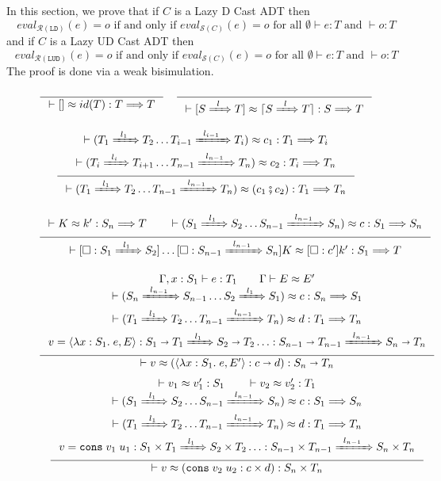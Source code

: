 \documentclass[runningheads]{llncs}
\newcommand{\infr}[2]{\inference{#1}{#2}}
\newcommand{\RMachine}[1]{\ensuremath{\mathcal{R}(#1)}}
\newcommand{\LDMachine}{\RMachine{\BLD}}
\newcommand{\LUDMachine}{\RMachine{\BLUD}}
\newcommand{\SMachine}[1]{\ensuremath{\mathcal{S}(#1)}}
\newcommand{\Pfunc}[2]{\ensuremath{#1 \shortrightarrow #2}}
\newcommand{\Pprod}[2]{\ensuremath{#1 \times #2}}
\newcommand{\elam}[3]{\lambda#1:#2.\;#3}
\newcommand{\econs}[2]{\mathtt{cons} \; #1 \; #2}
\newcommand{\ecast}[2]{\ensuremath{#1 : #2}}
\newcommand{\ccast}[3]{#1 \xRightarrow[]{\enskip #2 \enskip} #3}
\newcommand{\vfunc}[4]{\langle\elam{#1}{#2}{#3},#4\rangle}
\newcommand{\vfuncc}[6]{\ecast{#1}{\ccast{\Pfunc{#2}{#3}}{#4}{\Pfunc{#5}{#6}}}}
\newcommand{\vcons}[2]{\econs{#1}{#2}}
\newcommand{\vconsc}[6]{\ecast{#1}{\ccast{\Pprod{#2}{#3}}{#4}{\Pprod{#5}{#6}}}}
\newcommand{\BLD}[0]{\ensuremath{\mathtt{LD}}}
\newcommand{\BLUD}[0]{\ensuremath{\mathtt{LUD}}}
\newcommand{\Kcons}[2]{[#1]#2}
\newcommand{\Fcast}[1]{\ecast{\square}{#1}}
\newcommand{\compose}[2]{\ensuremath{#1 \fatsemi #2}}
\newcommand{\translate}[1]{\ensuremath{\lceil#1\rceil}}
\newcommand{\expressiontyping}[3]{\ensuremath{#1 \vdash #2 : #3}}
\newcommand{\valuetyping}[2]{\ensuremath{\vdash #1 : #2}}
\newcommand{\casttyping}[3]{\ensuremath{\vdash #1 : #2 \Longrightarrow #3}}
\newcommand{\withmachineevalto}[3]{\ensuremath{\mathit{eval}_{#1}(#2)=#3}}
\newcommand{\machineequiv}[2]{
	\ensuremath{
		\withmachineevalto{#1}{e}{o}	
		\text{ if and only if }
		\withmachineevalto{#2}{e}{o}
		\text{ for all }
		\expressiontyping{\emptyset}{e}{T}
		\text{ and }
		\valuetyping{o}{T}
	}}
\newcommand{\bisimE}[3]{\ensuremath{#1 \vdash #2 \approx #3}}
\newcommand{\bisimv}[3]{\valuetyping{#1 \approx #2}{#3}}
\newcommand{\bisimc}[4]{\casttyping{#1 \approx #2}{#3}{#4}}
\newcommand{\bisimK}[4]{\casttyping{#1 \approx #2}{#3}{#4}}
\begin{document}
In this section, we prove that if $C$ is a Lazy D Cast ADT then
\[
\machineequiv{\LDMachine}{\SMachine{C}}
\]
and if $C$ is a Lazy UD Cast ADT then
\[
\machineequiv{\LUDMachine}{\SMachine{C}}
\]
The proof is done via a weak bisimulation.


\begin{figure}

\fbox{\bisimc{\overline{\ccast{S}{l}{T}}}{c}{S}{T}}
\begin{gather*}
\infr{}{\bisimc{[]}{id(T)}{T}{T}} \quad
\infr{}{\bisimc{[\ccast{S}{l}{T}]}{\translate{\ccast{S}{l}{T}}}{S}{T}}
\\[1ex]
\infr{
	\bisimc{
		(\ccast{T_1}{l_1}{T_2}\ldots\ccast{T_{i-1}}{l_{i-1}}{T_i})
	}{c_1}{T_1}{T_i}\\
	\bisimc{
		(\ccast{T_i}{l_i}{T_{i+1}}\ldots\ccast{T_{n-1}}{l_{n-1}}{T_n})
	}{c_2}{T_i}{T_n}
}{
	\bisimc{
		(\ccast{T_1}{l_1}{T_{2}}\ldots\ccast{T_{n-1}}{l_{n-1}}{T_n})
	}{
		(\compose{c_1}{c_2})
	}{T_1}{T_n}
}
\end{gather*}

\fbox{$\bisimK{K}{K}{S}{T}$}
\begin{gather*}
\infr{
	\bisimK{K}{k'}{S_n}{T} \qquad
	\bisimc{
		(\ccast{S_1}{l_1}{S_2} \ldots \ccast{S_{n-1}}{l_{n-1}}{S_n})
	}{c}{S_1}{S_n}
}{
	\bisimK{
		\Kcons{
			\Fcast{\ccast{S_1}{l_1}{S_2}}
		}{\ldots\Kcons{\Fcast{\ccast{S_{n-1}}{l_{n-1}}{S_n}}}{K}}
	}{
		\Kcons{\Fcast{c'}}{k'}
	}{S_1}{T}
}
\end{gather*}

\fbox{$\bisimv{v}{v}{T}$}
\begin{gather*}
\infr{
	\expressiontyping{\Gamma,x : S_1}{e}{T_1}
	\qquad
	\bisimE{\Gamma}{E}{E'}
	\\
	\bisimc{
		(\ccast{S_n}{l_{n-1}}{S_{n-1}} \ldots
		\ccast{S_2}{l_1}{S_1})
	}{c}{S_n}{S_1}
	\\
	\bisimc{
		(		\ccast{T_1}{l_{1}}{T_2} \ldots
		\ccast{T_{n-1}}{l_{n-1}}{T_n}
		)	}{d}{T_1}{T_n}
	\\
	v = \vfuncc{
		\vfuncc{
			\vfunc{x}{S_1}{e}{E}
		}{S_1}{T_1}{l_1}{S_2}{T_2}
		\ldots
	}{S_{n-1}}{T_{n-1}}{l_{n-1}}{S_n}{T_n}
}{
	\bisimv{v}{
		(\ecast{\vfunc{x}{S_1}{e}{E'}}{\Pfunc{c}{d}})
	}{
		\Pfunc{S_n}{T_n}}
}
\\[1ex]
\infr{
	\bisimv{v_1}{v_1'}{S_1} \qquad
	\bisimv{v_2}{v_2'}{T_1} \\
	\bisimc{
		(\ccast{S_1}{l_{1}}{S_2} \ldots
		\ccast{S_{n-1}}{l_{n-1}}{S_n})
	}{c}{S_1}{S_n} \\
	\bisimc{
		(\ccast{T_1}{l_{1}}{T_2} \ldots
		\ccast{T_{n-1}}{l_{n-1}}{T_n})
	}{d}{T_1}{T_n}
	\\ v = \vconsc{
		\vconsc{
			\vcons{v_1}{u_1}
		}{S_1}{T_1}{l_1}{S_2}{T_2}
		\ldots
	}{S_{n-1}}{T_{n-1}}{l_{n-1}}{S_n}{T_n}
}{
	\bisimv{
		v
	}{
		(\ecast{\vcons{v_2}{u_2}}{\Pprod{c}{d}})
	}{
		\Pprod{S_n}{T_n}}
}
\end{gather*}
	

\end{figure}
\end{document}
